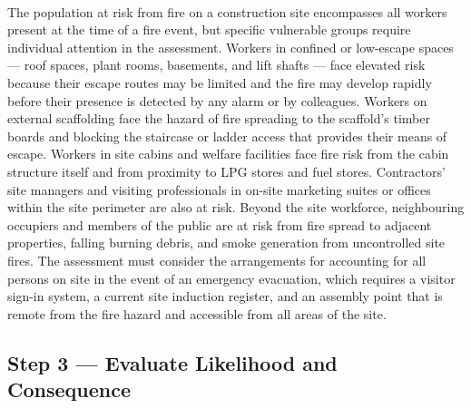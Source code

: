 \paragraph{}
The population at risk from fire on a construction site encompasses all workers present at the time of a fire event, but specific vulnerable groups require individual attention in the assessment. Workers in confined or low-escape spaces --- roof spaces, plant rooms, basements, and lift shafts --- face elevated risk because their escape routes may be limited and the fire may develop rapidly before their presence is detected by any alarm or by colleagues. Workers on external scaffolding face the hazard of fire spreading to the scaffold's timber boards and blocking the staircase or ladder access that provides their means of escape. Workers in site cabins and welfare facilities face fire risk from the cabin structure itself and from proximity to LPG stores and fuel stores. Contractors' site managers and visiting professionals in on-site marketing suites or offices within the site perimeter are also at risk. Beyond the site workforce, neighbouring occupiers and members of the public are at risk from fire spread to adjacent properties, falling burning debris, and smoke generation from uncontrolled site fires. The assessment must consider the arrangements for accounting for all persons on site in the event of an emergency evacuation, which requires a visitor sign-in system, a current site induction register, and an assembly point that is remote from the fire hazard and accessible from all areas of the site.

\subsection{Step 3 --- Evaluate Likelihood and Consequence}

